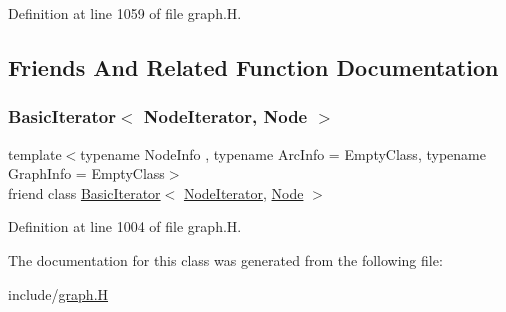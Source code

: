 Definition at line 1059 of file graph.\+H.



\subsection{Friends And Related Function Documentation}
\mbox{\label{class_designar_1_1_graph_1_1_node_iterator_a21dc6ae614d097ff896e9e8e422d8f3c}} 
\subsubsection{\texorpdfstring{Basic\+Iterator$<$ Node\+Iterator, Node $>$}{BasicIterator< NodeIterator, Node >}}
{\footnotesize\ttfamily template$<$typename Node\+Info , typename Arc\+Info  = Empty\+Class, typename Graph\+Info  = Empty\+Class$>$ \\
friend class \hyperlink{class_designar_1_1_basic_iterator}{Basic\+Iterator}$<$ \hyperlink{class_designar_1_1_graph_1_1_node_iterator}{Node\+Iterator}, \hyperlink{class_designar_1_1_graph_a5dfc7dba9d092ac489c72e40390c37d0}{Node} $>$\hspace{0.3cm}{\ttfamily [friend]}}



Definition at line 1004 of file graph.\+H.



The documentation for this class was generated from the following file\+:\begin{DoxyCompactItemize}
\item 
include/\hyperlink{graph_8_h}{graph.\+H}\end{DoxyCompactItemize}
